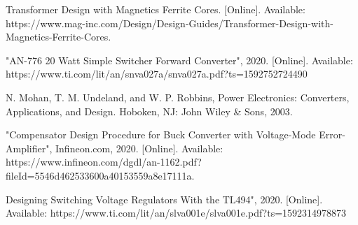 
\begin{thebibliography}{9}
Transformer Design with Magnetics Ferrite Cores. [Online]. Available: https://www.mag-inc.com/Design/Design-Guides/Transformer-Design-with-Magnetics-Ferrite-Cores.

"AN-776 20 Watt Simple Switcher Forward Converter", 2020. [Online]. Available: https://www.ti.com/lit/an/snva027a/snva027a.pdf?ts=1592752724490

 N. Mohan, T. M. Undeland, and W. P. Robbins, Power Electronics: Converters, Applications, and Design. Hoboken, NJ: John Wiley \& Sons, 2003.

"Compensator Design Procedure for Buck Converter with Voltage-Mode Error-Amplifier", Infineon.com, 2020. [Online]. Available: https://www.infineon.com/dgdl/an-1162.pdf?fileId=5546d462533600a40153559a8e17111a.

Designing Switching Voltage Regulators With the TL494", 2020. [Online]. Available: https://www.ti.com/lit/an/slva001e/slva001e.pdf?ts=1592314978873

\end{thebibliography}